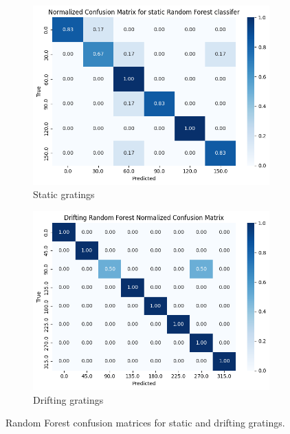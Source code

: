 \documentclass[10pt,twocolumn]{article}
\begin{document}
\begin{figure}[H]
  \centering
  \begin{subfigure}[b]{0.48\linewidth}
    \centering
    \includegraphics[width=\linewidth]{report_images/static_random_forest_confusion_matrix.png}
    \caption{Static gratings}
    \label{fig:static_rf_cm}
  \end{subfigure}
  \hfill
  \begin{subfigure}[b]{0.48\linewidth}
    \centering
    \includegraphics[width=\linewidth]{report_images/drifting_random_forest_confusion_matrix.png}
    \caption{Drifting gratings}
    \label{fig:drifting_rf_cm}
  \end{subfigure}
  \caption{Random Forest confusion matrices for static and drifting gratings.}
  \label{fig:rf_cm_comparison}
\end{figure}  
\end{document}

